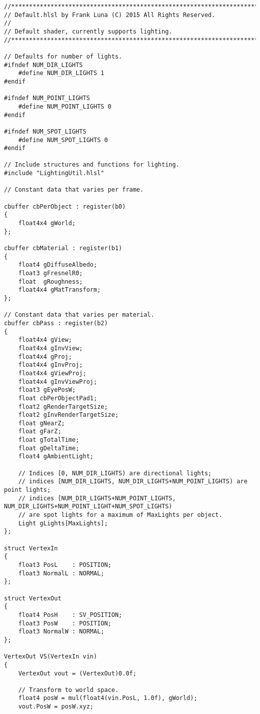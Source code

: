 \begin{lstlisting}
//***************************************************************************************
// Default.hlsl by Frank Luna (C) 2015 All Rights Reserved.
//
// Default shader, currently supports lighting.
//***************************************************************************************

// Defaults for number of lights.
#ifndef NUM_DIR_LIGHTS
    #define NUM_DIR_LIGHTS 1
#endif

#ifndef NUM_POINT_LIGHTS
    #define NUM_POINT_LIGHTS 0
#endif

#ifndef NUM_SPOT_LIGHTS
    #define NUM_SPOT_LIGHTS 0
#endif

// Include structures and functions for lighting.
#include "LightingUtil.hlsl"

// Constant data that varies per frame.

cbuffer cbPerObject : register(b0)
{
    float4x4 gWorld;
};

cbuffer cbMaterial : register(b1)
{
    float4 gDiffuseAlbedo;
    float3 gFresnelR0;
    float  gRoughness;
    float4x4 gMatTransform;
};

// Constant data that varies per material.
cbuffer cbPass : register(b2)
{
    float4x4 gView;
    float4x4 gInvView;
    float4x4 gProj;
    float4x4 gInvProj;
    float4x4 gViewProj;
    float4x4 gInvViewProj;
    float3 gEyePosW;
    float cbPerObjectPad1;
    float2 gRenderTargetSize;
    float2 gInvRenderTargetSize;
    float gNearZ;
    float gFarZ;
    float gTotalTime;
    float gDeltaTime;
    float4 gAmbientLight;

    // Indices [0, NUM_DIR_LIGHTS) are directional lights;
    // indices [NUM_DIR_LIGHTS, NUM_DIR_LIGHTS+NUM_POINT_LIGHTS) are point lights;
    // indices [NUM_DIR_LIGHTS+NUM_POINT_LIGHTS, NUM_DIR_LIGHTS+NUM_POINT_LIGHT+NUM_SPOT_LIGHTS)
    // are spot lights for a maximum of MaxLights per object.
    Light gLights[MaxLights];
};
 
struct VertexIn
{
    float3 PosL    : POSITION;
    float3 NormalL : NORMAL;
};

struct VertexOut
{
    float4 PosH    : SV_POSITION;
    float3 PosW    : POSITION;
    float3 NormalW : NORMAL;
};

VertexOut VS(VertexIn vin)
{
    VertexOut vout = (VertexOut)0.0f;

    // Transform to world space.
    float4 posW = mul(float4(vin.PosL, 1.0f), gWorld);
    vout.PosW = posW.xyz;


\end{lstlisting}
